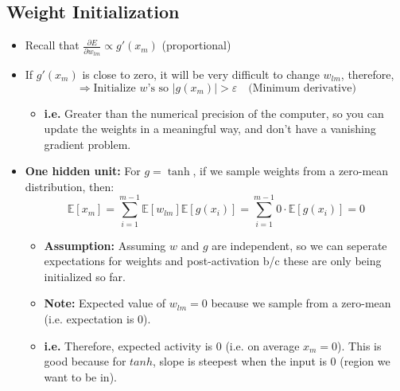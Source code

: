 \subsection{Weight Initialization}
\begin{summary}
    \begin{itemize}
        \item Recall that \( \frac{\partial E}{\partial w_{lm}} \propto g'(x_m) \) (proportional)
        
        \item If \( g'(x_m) \) is close to zero, it will be very difficult to change \( w_{lm} \), therefore,
        \[
        \Rightarrow \text{Initialize } w\text{'s so } |g(x_m)| > \varepsilon \quad \text{(Minimum derivative)}
        \]
        \begin{itemize}
            \item \textbf{i.e.} Greater than the numerical precision of the computer, so you can update the weights in a meaningful way, and don't have a vanishing gradient problem. 
        \end{itemize}
    
        \item \textbf{One hidden unit:} For \( g = \tanh \), if we sample weights from a zero-mean distribution, then:
        \[
        \mathbb{E}[x_m] = \sum_{i=1}^{m-1} \mathbb{E}[w_{lm}] \mathbb{E}[g(x_i)] = \sum_{i=1}^{m-1} 0 \cdot \mathbb{E}[g(x_i)] = 0
        \]
        \begin{itemize}
            \item \textbf{Assumption:} Assuming $w$ and $g$ are independent, so we can seperate expectations for weights and post-activation b/c these are only being initialized so far.
            \item \textbf{Note:} Expected value of $w_{lm} = 0$ because we sample from a zero-mean (i.e. expectation is 0).
            \item \textbf{i.e.} Therefore, expected activity is 0 (i.e. on average $x_m =0$). This is good because for $tanh$, slope is steepest when the input is $0$ (region we want to be in).
        \end{itemize}
        

\end{itemize}
\end{summary}
